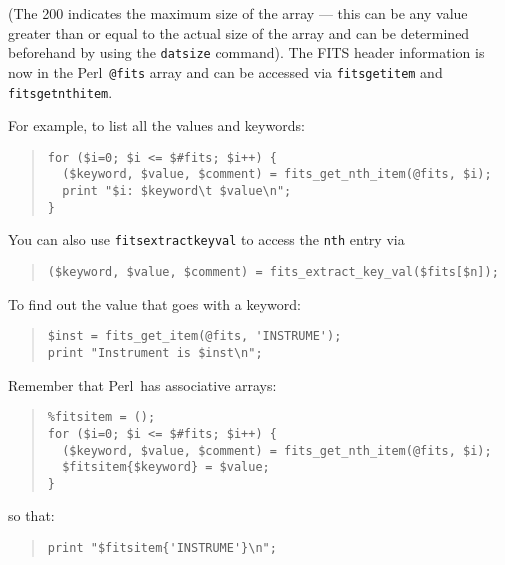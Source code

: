 \documentclass[twoside,11pt]{article}
\newenvironment{myquote}{\begin{quote}\begin{small}}{\end{small}\end{quote}}
\newcommand{\perl}{\xref{\textsf{Perl}}{sun193}{}}
\newcommand{\xref}[3]{#1}
\renewcommand{\_}{\texttt{\symbol{95}}}
\begin{document}
(The 200 indicates the maximum size of the array --- this can be any
value greater than or equal to the actual size of the array and can be
determined beforehand by using the \texttt{dat\_size} command).  The FITS
header information is now in the \perl\ \texttt{@fits} array and can be accessed
via \texttt{fits\_get\_item} and \texttt{fits\_get\_nth\_item}.

For example, to list all the values and keywords:

\begin{myquote}
\begin{verbatim}
for ($i=0; $i <= $#fits; $i++) {
  ($keyword, $value, $comment) = fits_get_nth_item(@fits, $i);
  print "$i: $keyword\t $value\n";
}
\end{verbatim}
\end{myquote}

You can also use \texttt{fits\_extract\_key\_val} to
access the \texttt{nth} entry via

\begin{myquote}
\begin{verbatim}
($keyword, $value, $comment) = fits_extract_key_val($fits[$n]);
\end{verbatim}
\end{myquote}

To find out the value that goes with a keyword:

\begin{myquote}
\begin{verbatim}
$inst = fits_get_item(@fits, 'INSTRUME');
print "Instrument is $inst\n";
\end{verbatim}
\end{myquote}

Remember that \perl\ has associative arrays:

\begin{myquote}
\begin{verbatim}
%fitsitem = ();
for ($i=0; $i <= $#fits; $i++) {
  ($keyword, $value, $comment) = fits_get_nth_item(@fits, $i);
  $fitsitem{$keyword} = $value;
}
\end{verbatim}
\end{myquote}

so that:

\begin{myquote}
\begin{verbatim}
print "$fitsitem{'INSTRUME'}\n";
\end{verbatim}
\end{myquote}
\end{document}
